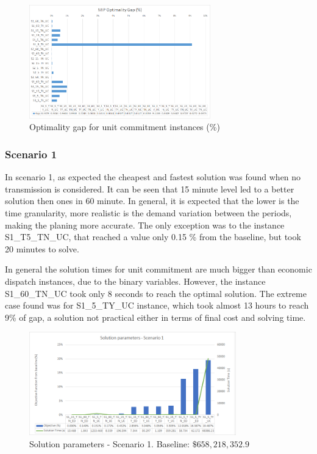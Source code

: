\documentclass[12pt,LUDisStyle,twosided]{book}
\begin{document}
\begin{figure}[H] 
  \centering
	  \includegraphics[width=0.7\textwidth,keepaspectratio]{mipgap.png}
  \caption{Optimality gap for unit commitment instances (\%)}
  \label{fig:mipgap}
\end{figure}


\subsubsection{Scenario 1}
In scenario 1, as expected the cheapest and fastest solution was found when no transmission is considered. It can be seen that 15 minute level led to a better solution then ones in 60 minute. In general, it is expected that the lower is the time granularity, more realistic is the demand variation between the periods, making the planing more accurate. The only exception was to the instance S1\_T5\_TN\_UC, that reached a value only 0.15 \% from the baseline, but took 20 minutes to solve. 

In general the solution times for unit commitment are much bigger than economic dispatch instances, due to the binary variables. However, the instance S1\_60\_TN\_UC took only 8 seconds to reach the optimal solution. The extreme case found was for S1\_5\_TY\_UC instance, which took almost 13 hours to reach 9\% of gap, a solution not practical either in terms of final cost and solving time.

\begin{figure}[H] 
  \centering
	  \includegraphics[width=0.8\textwidth,height=\textheight,keepaspectratio]{SolutionParametersS1.png}
  \caption{Solution parameters - Scenario 1. Baseline: $\$658,218,352.9$}
  \label{fig:solutionparameterss1}
\end{figure}
\end{document}
